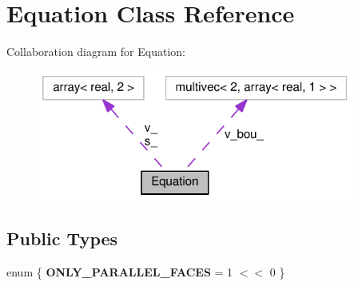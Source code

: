 \hypertarget{classEquation}{
\section{Equation Class Reference}
\label{classEquation}
}
Collaboration diagram for Equation:\nopagebreak
\begin{figure}[H]
\begin{center}
\leavevmode
\includegraphics[width=294pt]{classEquation__coll__graph}
\end{center}
\end{figure}
\subsection*{Public Types}
\begin{DoxyCompactItemize}
\item 
enum \{ {\bfseries ONLY\_\-PARALLEL\_\-FACES} =  1 $<$$<$ 0
 \}
\end{DoxyCompactItemize}
